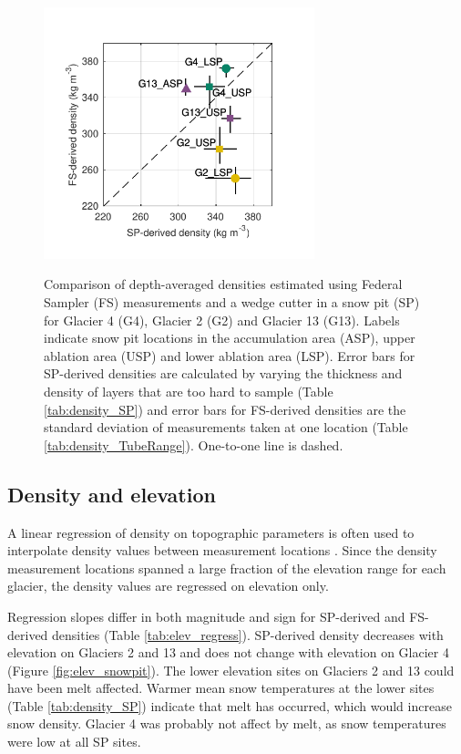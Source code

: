 \documentclass{sfuthesis}
\begin{document}
\begin{figure}[H]
	\centering
	\includegraphics[width =0.7\textwidth]{SPvsFS.pdf}\\
	\caption{Comparison of depth-averaged densities estimated using Federal Sampler (FS) measurements and a wedge cutter in a snow pit (SP)  for Glacier 4 (G4), Glacier 2 (G2) and Glacier 13 (G13). Labels indicate snow pit locations in the accumulation area (ASP), upper ablation area (USP) and lower ablation area (LSP). Error bars for SP-derived densities are calculated by varying the thickness and density of layers that are too hard to sample (Table \ref{tab:density_SP}) and error bars for FS-derived densities are the standard deviation of measurements taken at one location (Table \ref{tab:density_TubeRange}). One-to-one line is dashed.}
	\label{fig:density_pitVStube}
\end{figure}


\subsection{Density and elevation}

A linear regression of density on topographic parameters is often used to interpolate density values between measurement locations \citep[e.g.][]{Elder1998, Molotch2005,Wetlaufer2016}. Since the density measurement locations spanned a large fraction of the elevation range for each glacier, the density values are regressed on elevation only. 

Regression slopes differ in both magnitude and sign for SP-derived and FS-derived densities (Table \ref{tab:elev_regress}). SP-derived density decreases with elevation on Glaciers 2 and 13 and does not change with elevation on Glacier 4 (Figure \ref{fig:elev_snowpit}). The lower elevation sites on Glaciers 2 and 13 could have been melt affected. Warmer mean snow temperatures at the lower sites (Table \ref{tab:density_SP}) indicate that melt has occurred, which would increase snow density. Glacier 4 was probably not affect by melt, as snow temperatures were low at all SP sites. 
\end{document}

